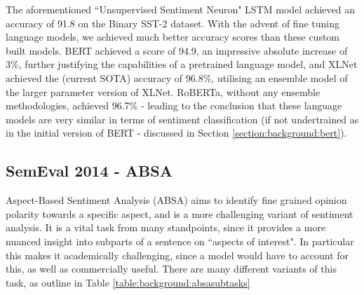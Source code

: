 {{The aforementioned ``Unsupervised Sentiment Neuron" LSTM model achieved an accuracy of 91.8 on the Binary SST-2 dataset. With the advent of fine tuning language models, we achieved much better accuracy scores than these custom built models. BERT achieved a score of 94.9, an impressive absolute increase of 3\%, further justifying the capabilities of a pretrained language model, and XLNet achieved the (current SOTA) accuracy of 96.8\%, utilising an ensemble model of the larger parameter version of XLNet. RoBERTa, without any ensemble methodologies, achieved 96.7\% - leading to the conclusion that these language models are very similar in terms of sentiment classification (if not undertrained as in the initial version of BERT - discussed in Section \ref{section:background:bert}).

\subsection{SemEval 2014 - ABSA} \label{section:background:semeval}
Aspect-Based Sentiment Analysis (ABSA) aims to identify fine grained opinion polarity towards a specific aspect, and is a more challenging variant of sentiment analysis. It is a vital task from many standpoints, since it provides a more nuanced insight into subparts of a sentence on ``aspects of interest". In particular this makes it academically challenging, since a model would have to account for this, as well as commercially useful. There are many different variants of this task, as outline in Table \ref{table:background:absasubtasks}
\begin{center}
	 \label{table:background:absasubtasks}
\end{center}	

}}

